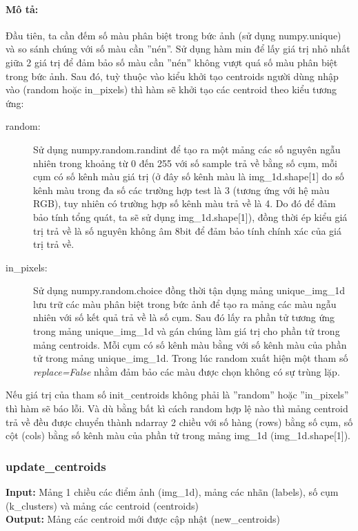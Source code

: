 \documentclass{article}
\begin{document}
\paragraph*{Mô tả:} Đầu tiên, ta cần đếm số màu phân biệt trong bức ảnh (sử dụng numpy.unique) và so sánh chúng với số màu cần ''nén''. Sử dụng hàm min để lấy giá trị nhỏ nhất giữa 2 giá trị để đảm bảo số màu cần ''nén'' không vượt quá số màu phân biệt trong bức ảnh. Sau đó, tuỳ thuộc vào kiểu khởi tạo centroids người dùng nhập vào (random hoặc in\_pixels) thì hàm sẽ khởi tạo các centroid theo kiểu tương ứng:
\begin{description}
  \item [random:] Sử dụng numpy.random.randint để tạo ra một mảng các số nguyên ngẫu nhiên trong khoảng từ 0 đến 255 với số sample trả về bằng số cụm, mỗi cụm có số kênh màu giá trị (ở đây số kênh màu là img\_1d.shape[1] do số kênh màu trong đa số các trường hợp test là 3 (tương ứng với hệ màu RGB), tuy nhiên có trường hợp số kênh màu trả về là 4. Do đó để đảm bảo tính tổng quát, ta sẽ sử dụng img\_1d.shape[1]), đồng thời ép kiểu giá trị trả về là số nguyên không âm 8bit để đảm bảo tính chính xác của giá trị trả về.
  \item [in\_pixels:] Sử dụng numpy.random.choice đồng thời tận dụng mảng unique\_img\_1d lưu trữ các màu phân biệt trong bức ảnh để tạo ra mảng các màu ngẫu nhiên với số kết quả trả về là số cụm. Sau đó lấy ra phần tử tương ứng trong mảng unique\_img\_1d và gán chúng làm giá trị cho phần tử trong mảng centroids. Mỗi cụm có số kênh màu bằng với số kênh màu của phần tử trong mảng unique\_img\_1d. Trong lúc random xuất hiện một tham số \textit{replace=False} nhằm đảm bảo các màu được chọn không có sự trùng lặp.
\end{description}
Nếu giá trị của tham số init\_centroids không phải là ''random'' hoặc ''in\_pixels'' thì hàm sẽ báo lỗi. Và dù bằng bất kì cách random hợp lệ nào thì mảng centroid trả về đều được chuyển thành ndarray 2 chiều với số hàng (rows) bằng số cụm, số cột (cols) bằng số kênh màu của phần tử trong mảng img\_1d (img\_1d.shape[1]).

\subsubsection{update\_centroids}
\textbf{Input:} Mảng 1 chiều các điểm ảnh (img\_1d), mảng các nhãn (labels), số cụm (k\_clusters) và mảng các centroid (centroids) \\
\textbf{Output:} Mảng các centroid mới được cập nhật (new\_centroids)
\end{document}
